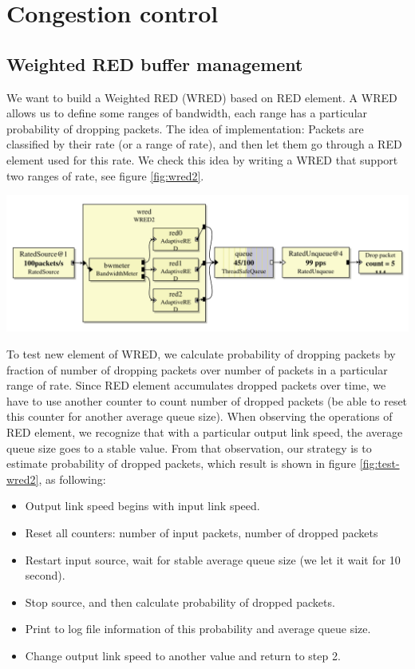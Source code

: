 \documentclass[a4paper]{article}
\begin{document}
  \section{Congestion control}
  \subsection{Weighted RED buffer management}
  We want to build a Weighted RED (WRED) based on RED element. A WRED allows us to define some ranges of bandwidth, each range has a particular probability of dropping packets. The idea of implementation: Packets are classified by their rate (or a range of rate), and then let them go through a RED element used for this rate. We check this idea by writing a WRED that support two ranges of rate, see figure \ref{fig:wred2}.
    \begin{center}
	  \includegraphics[scale=0.5]{wred2.pdf}
	  \label{fig:wred2}
    \end{center}
  To test new element of WRED, we calculate probability of dropping packets by fraction of number of dropping packets over number of packets in a particular range of rate. Since RED element accumulates dropped packets over time, we have to use another counter to count number of dropped packets (be able to reset this counter for another average queue size). When observing the operations of RED element, we recognize that with a particular output link speed, the average queue size goes to a stable value. From that observation, our strategy is to estimate probability of dropped packets, which result is shown in figure \ref{fig:test-wred2}, as following:
  \begin{itemize}
  	\item Output link speed begins with input link speed.
  	\item Reset all counters: number of input packets, number of dropped packets
  	\item Restart input source, wait for stable average queue size (we let it wait for 10 second).
  	\item Stop source, and then calculate probability of dropped packets.
  	\item Print to log file information of this probability and average queue size.
  	\item Change output link speed to another value and return to step 2.
  \end{itemize}
\end{document}
